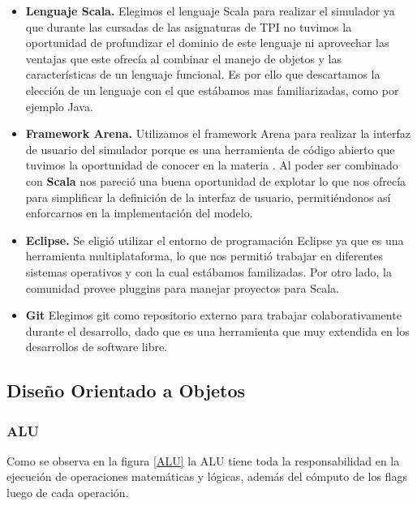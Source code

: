 \begin{itemize}


\item  \textbf{Lenguaje Scala.}
Elegimos el lenguaje Scala para realizar el simulador ya que durante las cursadas de las asignaturas de TPI no tuvimos la oportunidad de profundizar el dominio de este lenguaje ni aprovechar las ventajas que este ofrecía al combinar el manejo de objetos y las características de un lenguaje funcional. Es por ello que descartamos la elección de un lenguaje con el que estábamos mas familiarizadas, como por ejemplo Java.

\item  \textbf{Framework Arena.}
Utilizamos el framework Arena para realizar la interfaz de usuario del simulador porque es una herramienta de código abierto que tuvimos la oportunidad de conocer en la materia \ui. Al poder ser combinado con \textbf{Scala} nos pareció una buena oportunidad de explotar lo que nos ofrecía para simplificar la definición de la interfaz de usuario, permitiéndonos así enforcarnos en la implementación del modelo. 

\item  \textbf{Eclipse.}
Se eligió utilizar el entorno de programación Eclipse ya que es una herramienta multiplataforma, lo que nos permitió trabajar en diferentes sistemas operativos y con la cual estábamos familizadas.  Por otro lado, la comunidad provee pluggins para manejar proyectos para Scala.

\item  \textbf{Git}
Elegimos git como repositorio externo para trabajar colaborativamente durante el desarrollo, dado que es una herramienta que muy extendida en los desarrollos de software libre.

\end{itemize}

\subsection{Diseño Orientado a Objetos}

\subsubsection{ALU}
Como se observa en la figura \ref{ALU} la ALU tiene toda la responsabilidad en la ejecución de operaciones matemáticas y lógicas, además del cómputo de los flags luego de cada operación. 

